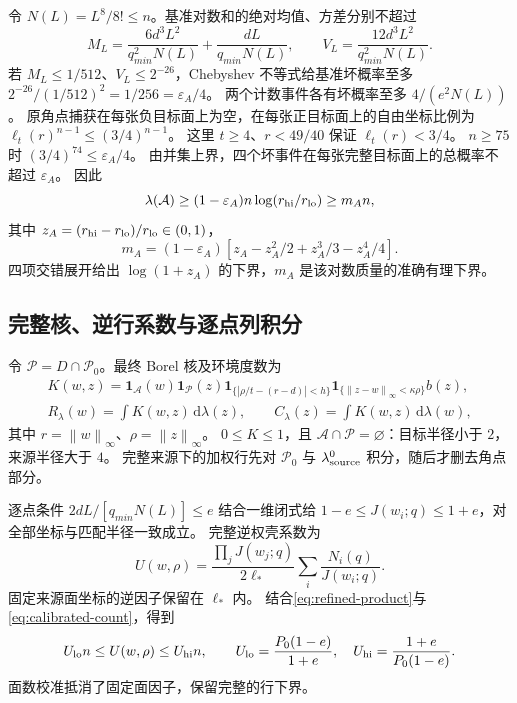 \documentclass[UTF8,a4paper,11pt,fontset=fandol]{ctexart}
\theoremstyle{remark}
\newcommand{\one}{\mathbf 1}
\newcommand{\norm}[1]{\left\lVert#1\right\rVert}
\newcommand{\dint}{\,\mathrm d}
\begin{document}
令 $N(L)=L^8/8!\le n$。基准对数和的绝对均值、方差分别不超过
\begin{equation}\label{eq:refined-mean-var}
 M_L=\frac{6d^3L^2}{q_{min}^2N(L)}+\frac{dL}{q_{min}N(L)},\qquad
 V_L=\frac{12d^3L^2}{q_{min}^2N(L)}.
\end{equation}
若 $M_L\le1/512$、$V_L\le2^{-26}$，Chebyshev 不等式给基准坏概率至多
$2^{-26}/(1/512)^2=1/256=\varepsilon_A/4$。
两个计数事件各有坏概率至多 $4/(e^2N(L))$。
原角点捕获在每张负目标面上为空，在每张正目标面上的自由坐标比例为
$\ell_t(r)^{n-1}\le(3/4)^{n-1}$。
这里 $t\ge4$、$r<49/40$ 保证 $\ell_t(r)<3/4$。
$n\ge75$ 时 $(3/4)^{74}\le\varepsilon_A/4$。
由并集上界，四个坏事件在每张完整目标面上的总概率不超过 $\varepsilon_A$。
因此
\begin{equation}\label{eq:refined-mass}
 \lambda(\mathcal A)\ge(1-\varepsilon_A)n\log(r_{\rm hi}/r_{\rm lo})\ge m_A n,
\end{equation}
其中 $z_A=(r_{\rm hi}-r_{\rm lo})/r_{\rm lo}\in(0,1)$，
\[
 m_A=(1-\varepsilon_A)[z_A-z_A^2/2+z_A^3/3-z_A^4/4].
\]
四项交错展开给出 $\log(1+z_A)$ 的下界，$m_A$ 是该对数质量的准确有理下界。

\subsection{完整核、逆行系数与逐点列积分}\label{subsec:refined-degrees}
令 $\mathcal P=D\cap\mathcal P_0$。最终 Borel 核及环境度数为
\begin{gather*}
 K(w,z)=\one_{\mathcal A}(w)\one_{\mathcal P}(z)
 \one_{\{|\rho/t-(r-d)|<h\}}\one_{\{\norm{z-w}_\infty<\kappa\rho\}}b(z),\\
 R_\lambda(w)=\int K(w,z)\dint\lambda(z),\qquad
 C_\lambda(z)=\int K(w,z)\dint\lambda(w),
\end{gather*}
其中 $r=\norm w_\infty$、$\rho=\norm z_\infty$。
$0\le K\le1$，且 $\mathcal A\cap\mathcal P=\varnothing$：目标半径小于 $2$，来源半径大于 $4$。
完整来源下的加权行先对 $\mathcal P_0$ 与 $\lambda^0_{\rm source}$ 积分，随后才删去角点部分。

逐点条件 $2dL/[q_{min}N(L)]\le e$ 结合一维闭式给
$1-e\le J(w_i;q)\le1+e$，对全部坐标与匹配半径一致成立。
完整逆权壳系数为
\[
 U(w,\rho)=\frac{\prod_jJ(w_j;q)}{2\ell_*}
                \sum_i\frac{N_i(q)}{J(w_i;q)}.
\]
固定来源面坐标的逆因子保留在 $\ell_*$ 内。
结合\eqref{eq:refined-product}与\eqref{eq:calibrated-count}，得到
\begin{equation}\label{eq:refined-U}
 U_{\rm lo}n\le U(w,\rho)\le U_{\rm hi}n,\qquad
 U_{\rm lo}=\frac{P_0(1-e)}{1+e},\quad
 U_{\rm hi}=\frac{1+e}{P_0(1-e)}.
\end{equation}
面数校准抵消了固定面因子，保留完整的行下界。
\end{document}
